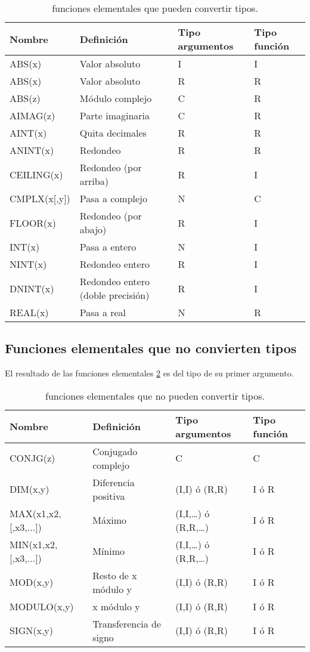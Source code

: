 \begin{table}[h!] \centering
	\begin{tabular}{l|l|l|l} 
	Nombre & Definición &  Tipo argumentos & Tipo función \\ \hline
	ABS(x) & Valor absoluto & I & I \\
	ABS(x) & Valor absoluto & R & R  \\
	ABS(z) & Módulo complejo & C & R \\
	AIMAG(z) & Parte imaginaria & C & R \\
	AINT(x) & Quita decimales &  R & R \\
	ANINT(x) & Redondeo & R & R \\
	CEILING(x) & Redondeo  (por arriba) &  R & I \\
	CMPLX(x[,y]) & Pasa a complejo & N  & C \\
	FLOOR(x) & Redondeo (por abajo) & R  & I \\
	INT(x) & Pasa a entero & N & I \\
	NINT(x) & Redondeo entero  & R  & I \\
	DNINT(x) & Redondeo entero (doble precisión) & R  & I \\
	REAL(x) & Pasa a real & N & R \\
	\end{tabular}
	\caption{funciones elementales que pueden convertir tipos.}
	\label{Tab:01-03}
\end{table}

\subsection{Funciones elementales que no convierten tipos}


El resultado de las funciones elementales \ref{Tab:01-03} es del tipo de su primer argumento.

\begin{table}[h!] \centering
	\begin{tabular}{l|l|l|l}
		Nombre & Definición &  Tipo argumentos & Tipo función \\ \hline
		CONJG(z) & Conjugado complejo & C & C \\
		DIM(x,y) & Diferencia positiva & (I,I)  ó (R,R) & I ó R \\
		MAX(x1,x2,[,x3,...]) & Máximo & (I,I,…) ó (R,R,…)  & I ó R \\
		MIN(x1,x2,[,x3,...]) & Mínimo & (I,I,…) ó (R,R,…) & I ó R \\
		MOD(x,y) & Resto de x módulo y  & (I,I) ó (R,R) & I ó R \\
		MODULO(x,y)  & x módulo y & (I,I) ó (R,R) & I ó R \\ 
		SIGN(x,y) & Transferencia de signo & (I,I) ó (R,R) & I ó R \\
	\end{tabular}
	\caption{funciones elementales que no pueden convertir tipos.}
	\label{Tab:01-03}
\end{table}

